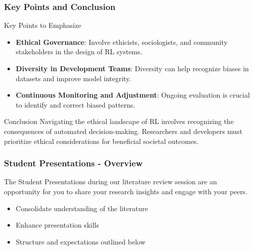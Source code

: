 \documentclass[aspectratio=169]{beamer}
\begin{document}
\begin{frame}[fragile]
    \frametitle{Key Points and Conclusion}

    \begin{block}{Key Points to Emphasize}
        \begin{itemize}
            \item \textbf{Ethical Governance}: Involve ethicists, sociologists, and community stakeholders in the design of RL systems.
            \item \textbf{Diversity in Development Teams}: Diversity can help recognize biases in datasets and improve model integrity.
            \item \textbf{Continuous Monitoring and Adjustment}: Ongoing evaluation is crucial to identify and correct biased patterns.
        \end{itemize}
    \end{block}

    \begin{block}{Conclusion}
        Navigating the ethical landscape of RL involves recognizing the consequences of automated decision-making. Researchers and developers must prioritize ethical considerations for beneficial societal outcomes.
    \end{block}
\end{frame}

\begin{frame}[fragile]
    \frametitle{Student Presentations - Overview}
    The Student Presentations during our literature review session are an opportunity for you to share your research insights and engage with your peers. 
    \begin{itemize}
        \item Consolidate understanding of the literature
        \item Enhance presentation skills
        \item Structure and expectations outlined below
    \end{itemize}
\end{frame}
\end{document}
